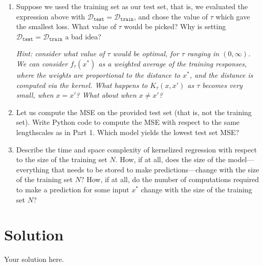 \documentclass[submit]{harvardml}
\newenvironment{solution}
  {\color{blue}\section*{Solution}}
{}
\begin{document}
\begin{problem}
\begin{enumerate}
\item Suppose we used the training set as our test set, that is, we evaluated the expression above with $\mathcal{D}_\texttt{test} = \mathcal{D}_\texttt{train}$, and chose the value of $\tau$ which gave the smallest loss.  What value of $\tau$ would be picked?  Why is setting $\mathcal{D}_\texttt{test} = \mathcal{D}_\texttt{train}$ a bad idea?
   
\emph{Hint: consider what value of $\tau$ would be optimal, for $\tau$ ranging in $(0, \infty)$. We can consider $f_\tau(x^*)$ as a weighted average of the training responses, where the weights are proportional to the distance to $x^*$, and the distance is computed via the kernel. What happens to $K_\tau(x, x')$ as $\tau$ becomes very small, when $x = x'$? What about when $x \neq x'$?}

\item Let us compute the MSE on the provided test set (that is, not the training set). Write Python code to compute the MSE with respect to the same lengthscales as in Part 1. Which model yields the lowest test set MSE? 

\item Describe the time and space complexity of kernelized regression with respect to the size of the training set $N$.  How, if at all, does the size of the model---everything that needs to be stored to make predictions---change with the size of the training set $N$?  How, if at all, do the number of computations required to make a prediction for some input $x^*$ change with the size of the training set $N$?

\end{enumerate}

\end{problem}


\begin{solution}
	Your solution here.
\end{solution}

\end{document}
